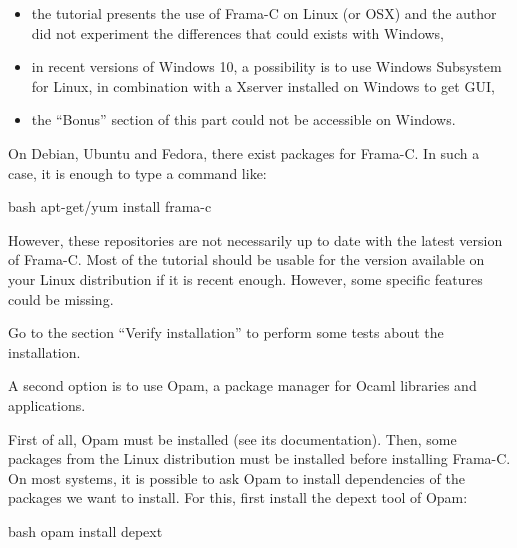 \begin{Warning}
\begin{itemize}
  \item the tutorial presents the use of Frama-C on Linux (or OSX) and
    the author did not experiment the differences that could exists with Windows,
  \item in recent versions of Windows 10, a possibility is to use Windows
    Subsystem for Linux, in combination with a Xserver installed on Windows
    to get GUI,
  \item the ``Bonus'' section of this part could not be accessible on Windows.
  \end{itemize}
\end{Warning}






On Debian, Ubuntu and Fedora, there exist packages for Frama-C. In
such a case, it is enough to type a command like:



\begin{CodeBlock}{bash}
apt-get/yum install frama-c
\end{CodeBlock}



However, these repositories are not necessarily up to date with the latest
version of Frama-C. Most of the tutorial should be usable for the version
available on your Linux distribution if it is recent enough. However, some
specific features could be missing.



Go to the section ``Verify installation'' to perform some tests about
the installation.






A second option is to use Opam, a package manager for Ocaml libraries
and applications.



First of all, Opam must be installed (see its documentation). Then, some
packages from the Linux distribution must be installed before
installing Frama-C. On most systems, it is possible to ask Opam to install
dependencies of the packages we want to install. For this, first install
the depext tool of Opam:


\begin{CodeBlock}{bash}
opam install depext
\end{CodeBlock}



